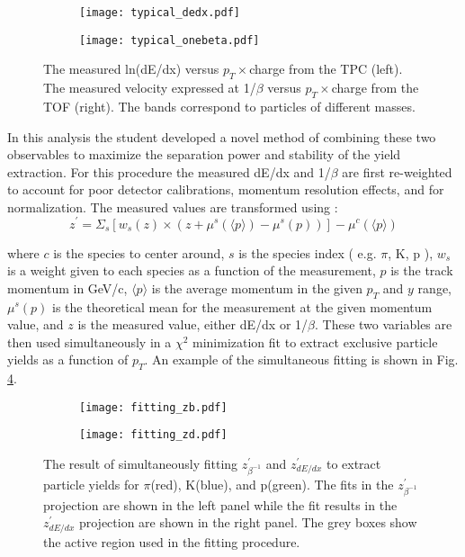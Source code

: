 	\begin{figure}
		\centering 
		\begin{subfigure}[b]{0.49\textwidth} 
			\texttt{[image: typical\_dedx.pdf]} 
			\label{fig:typical_dEdx} 
		\end{subfigure} 
		\begin{subfigure}[b]{0.49\textwidth} 
			\texttt{[image: typical\_onebeta.pdf]} 
			\label{fig:typical_onebeta} 
		\end{subfigure}
		\caption{ \label{fig:typical_pid} The measured ln(dE/dx) versus $p_T \times $charge from the TPC (left). The measured velocity expressed at 1/$\beta$ versus $p_T \times$charge from the TOF (right). The bands correspond to particles of different masses. } 
	\end{figure}

	In this analysis the student developed a novel method of combining these two observables to maximize the separation power and stability of the yield extraction. For this procedure the measured dE/dx and 1/$\beta$ are first re-weighted to account for poor detector calibrations, momentum resolution effects, and for normalization. The measured values are transformed using :
	\begin{equation}
		z^{\prime} = \Sigma_{s} \left[ w_{s}(z) \times \left( z + \mu^{s}(\langle p \rangle ) - \mu^{s}(p) \right) \right] - \mu^{c}(\langle p \rangle)
	\end{equation}

	where $c$ is the species to center around, $s$ is the species index ( e.g. $\pi$, K, p ), $w_{s}$ is a weight given to each species as a function of the measurement, $p$ is the track momentum in GeV/c, $\langle p \rangle$ is the average momentum in the given $p_T$ and $y$ range, $\mu^{s}(p)$ is the theoretical mean for the measurement at the given momentum value, and $z$ is the measured value, either dE/dx or 1/$\beta$. These two variables are then used simultaneously in a $\chi^2$ minimization fit to extract exclusive particle yields as a function of $p_T$. An example of the simultaneous fitting is shown in Fig. \ref{fig:fitting}.

	\begin{figure}
		\centering 
		\begin{subfigure}[b]{0.49\textwidth} 
			\texttt{[image: fitting\_zb.pdf]}  
		\end{subfigure} 
		\begin{subfigure}[b]{0.49\textwidth} 
			\texttt{[image: fitting\_zd.pdf]} 
		\end{subfigure}

		\caption{ \label{fig:fitting} The result of simultaneously fitting $z^{\prime}_{\beta^{-1}}$ and $z^{\prime}_{dE/dx}$ to extract particle yields for $\pi$(red), K(blue), and p(green). The fits in the $z^{\prime}_{\beta^{-1}}$ projection are shown in the left panel while the fit results in the $z^{\prime}_{dE/dx}$ projection are shown in the right panel. The grey boxes show the active region used in the fitting procedure. }  
	\end{figure}


